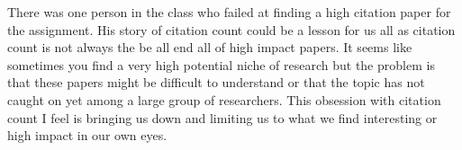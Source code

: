 \documentclass[conference]{IEEEtran}
\begin{document}
There was one person in the class who failed at finding a high citation paper
for the assignment. His story of citation count could be a lesson for us all
as citation count is not always the be all end all of high impact papers. It
seems like sometimes you find a very high potential niche of research but the 
problem is that these papers might be difficult to understand or that the topic
has not caught on yet among a large group of researchers. This obsession with
citation count I feel is bringing us down and limiting us to what we find 
interesting or high impact in our own eyes.


\balance



\end{document}
